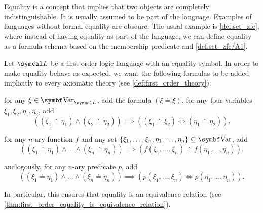 \begin{remark}\label{remark:first_order_equality}
  Equality is a concept that implies that two objects are completely indistinguishable. It is usually assumed to be part of the language. Examples of languages without formal equality are obscure. The usual example is \cref{def:set_zfc}, where instead of having equality as part of the language, we can define equality as a formula schema based on the membership predicate and \cref{def:set_zfc/A1}.

  Let \( \Cal{L} \) be a first-order logic language with an equality symbol. In order to make equality behave as expected, we want the following formulas to be added implicitly to every axiomatic theory (see \cref{def:first_order_theory}):

  \begin{defenum}
     for any \( \xi \in \Cat{Var}_{\Cal{L}} \), add the formula \( (\xi \doteq \xi) \).
     for any four variables \( \xi_1, \xi_2, \eta_1, \eta_2 \), add
    \begin{equation*}
      ((\xi_1 \doteq \eta_1) \land (\xi_2 \doteq \eta_2)) \implies ((\xi_1 \doteq \xi_2) \iff (\eta_1 \doteq \eta_2)).
    \end{equation*}

     for any \( n \)-ary function \( f \) and any set \( \{ \xi_1, \ldots, \xi_n, \eta_1, \ldots, \eta_n \} \subseteq \Cat{Var} \), add
    \begin{equation*}
      ((\xi_1 \doteq \eta_1) \land \ldots \land (\xi_n \doteq \eta_n)) \implies (f(\xi_1, \ldots, \xi_n) \doteq f(\eta_1, \ldots, \eta_n)).
    \end{equation*}

     analogously, for any \( n \)-ary predicate \( p \), add
    \begin{equation*}
      ((\xi_1 \doteq \eta_1) \land \ldots \land (\xi_n \doteq \eta_n)) \implies (p(\xi_1, \ldots, \xi_n) \iff p(\eta_1, \ldots, \eta_n)).
    \end{equation*}
  \end{defenum}

  In particular, this ensures that equality is an equivalence relation (see \cref{thm:first_order_equality_is_equivalence_relation}).
\end{remark}

